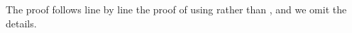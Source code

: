 \begin{pro}
The proof follows line by line the proof of  using
 rather than , and we omit the details.\proEnd  
\end{pro}

